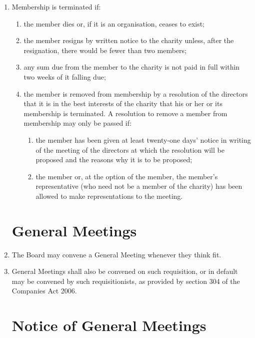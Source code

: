 \begin{enumerate}
\item
  Membership is terminated if:
  \begin{enumerate}
  \item
    the member dies or, if it is an organisation, ceases to exist;
  \item
    the member resigns by written notice to the charity unless, after
    the resignation, there would be fewer than two members;
  \item
    any sum due from the member to the charity is not paid in full
    within two weeks of it falling due;
  \item
    the member is removed from membership by a resolution of the
    directors that it is in the best interests of the charity that his
    or her or its membership is terminated. A resolution to remove a
    member from membership may only be passed if:
    \begin{enumerate}
    \item
      the member has been given at least twenty-one days' notice in
      writing of the meeting of the directors at which the resolution
      will be proposed and the reasons why it is to be proposed;
    \item
      the member or, at the option of the member, the member's
      representative (who need not be a member of the charity) has been
      allowed to make representations to the meeting.
    \end{enumerate}
  \end{enumerate}

\section{General Meetings}
\item
    The Board may convene a General Meeting whenever they think fit. 

\item 
    General Meetings shall also be convened on such requisition, or in default may be convened by such
    requisitionists, as provided by section 304 of the Companies Act 2006.

\section{Notice of General Meetings}


\end{enumerate}
